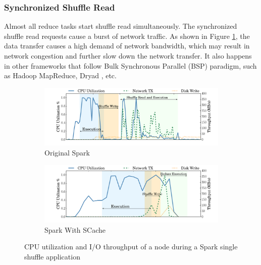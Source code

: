 \subsubsection{Synchronized Shuffle Read}
Almost all reduce tasks start shuffle read simultaneously. 
The synchronized shuffle read requests cause a burst of network traffic. 
As shown in Figure \ref{fig:util}, 
the data transfer causes a high demand of network bandwidth, which may result in network congestion and further slow down the network transfer.
It also happens in other frameworks that follow Bulk Synchronous Parallel (BSP) paradigm, such as Hadoop MapReduce, Dryad \cite{dryad}, etc.
\begin{figure}
	\centering
	\begin{subfigure}[b]{0.47\linewidth}
		\includegraphics[width=\linewidth]{fig/util}
		\caption{Original Spark}
		\label{fig:util}
	\end{subfigure}
	\begin{subfigure}[b]{0.47\linewidth}
		\includegraphics[width=\linewidth]{fig/scache_util}
		\caption{Spark With SCache}
		\label{fig:scache_util}
	\end{subfigure}
	\caption{CPU utilization and I/O throughput of a node during a Spark single shuffle application}
\end{figure}

